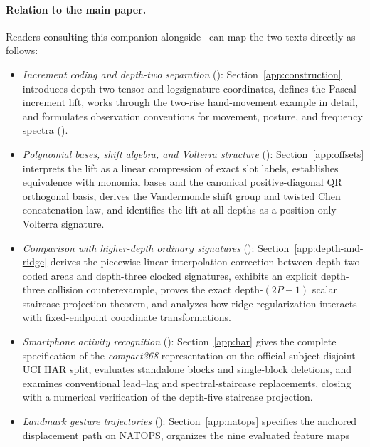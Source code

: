 \documentclass[10pt,a4paper]{article}
\numberwithin{equation}{section}
\theoremstyle{plain}
\theoremstyle{definition}
\begin{document}
\paragraph{Relation to the main paper.}
Readers consulting this companion alongside~\cite{mainpaper} can map the two
texts directly as follows:
\begin{itemize}
\item \emph{Increment coding and depth-two separation} (\cite[Sections~1--2,
Fig.~1, Eqs.~(1)--(4)]{mainpaper}): Section~\ref{app:construction} introduces
depth-two tensor and logsignature coordinates, defines the Pascal increment
lift, works through the two-rise hand-movement example in detail, and formulates
observation conventions for movement, posture, and frequency spectra
(\cite[Section~3, Eq.~(5)]{mainpaper}).
\item \emph{Polynomial bases, shift algebra, and Volterra structure}
(\cite[Section~2, concluding paragraph; Section~4, opening paragraph]{mainpaper}):
Section~\ref{app:offsets} interprets the lift as a linear compression of exact
slot labels, establishes equivalence with monomial bases and the canonical
positive-diagonal QR orthogonal basis, derives the Vandermonde shift group and
twisted Chen concatenation law, and identifies the lift at all depths as a
position-only Volterra signature.
\item \emph{Comparison with higher-depth ordinary signatures}
(\cite[Section~2 and Section~3, concluding paragraph]{mainpaper}):
Section~\ref{app:depth-and-ridge} derives the piecewise-linear interpolation
correction between depth-two coded areas and depth-three clocked signatures,
exhibits an explicit depth-three collision counterexample, proves the exact
depth-\((2P-1)\) scalar staircase projection theorem, and analyzes how ridge
regularization interacts with fixed-endpoint coordinate transformations.
\item \emph{Smartphone activity recognition}
(\cite[Sections~4--5, Table~1]{mainpaper}): Section~\ref{app:har} gives the
complete specification of the \emph{compact368} representation on the official
subject-disjoint UCI HAR split, evaluates standalone blocks and single-block
deletions, and examines conventional lead--lag and spectral-staircase
replacements, closing with a numerical verification of the depth-five staircase
projection.
\item \emph{Landmark gesture trajectories}
(\cite[Section~5, Table~2]{mainpaper}): Section~\ref{app:natops} specifies the
anchored displacement path on NATOPS, organizes the nine evaluated feature maps

\end{itemize}
\end{document}
